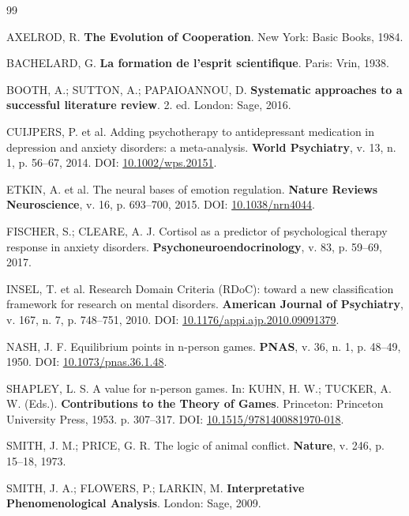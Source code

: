 \documentclass[12pt,a4paper]{article}
\begin{document}
\begin{thebibliography}{99}

AXELROD, R. \textbf{The Evolution of Cooperation}. New York: Basic Books, 1984.

BACHELARD, G. \textbf{La formation de l'esprit scientifique}. Paris: Vrin, 1938.

BOOTH, A.; SUTTON, A.; PAPAIOANNOU, D. \textbf{Systematic approaches to a successful literature review}. 2. ed. London: Sage, 2016.

CUIJPERS, P. et al. Adding psychotherapy to antidepressant medication in depression and anxiety disorders: a meta-analysis. \textbf{World Psychiatry}, v. 13, n. 1, p. 56--67, 2014.
DOI: \href{https://doi.org/10.1002/wps.20151}{10.1002/wps.20151}.

ETKIN, A. et al. The neural bases of emotion regulation. \textbf{Nature Reviews Neuroscience}, v. 16, p. 693--700, 2015.
DOI: \href{https://doi.org/10.1038/nrn4044}{10.1038/nrn4044}.

FISCHER, S.; CLEARE, A. J. Cortisol as a predictor of psychological therapy response in anxiety disorders. \textbf{Psychoneuroendocrinology}, v. 83, p. 59--69, 2017.

INSEL, T. et al. Research Domain Criteria (RDoC): toward a new classification framework for research on mental disorders. \textbf{American Journal of Psychiatry}, v. 167, n. 7, p. 748--751, 2010.
DOI: \href{https://doi.org/10.1176/appi.ajp.2010.09091379}{10.1176/appi.ajp.2010.09091379}.

NASH, J. F. Equilibrium points in n-person games. \textbf{PNAS}, v. 36, n. 1, p. 48--49, 1950.
DOI: \href{https://doi.org/10.1073/pnas.36.1.48}{10.1073/pnas.36.1.48}.

SHAPLEY, L. S. A value for n-person games. In: KUHN, H. W.; TUCKER, A. W. (Eds.). \textbf{Contributions to the Theory of Games}. Princeton: Princeton University Press, 1953. p. 307--317.
DOI: \href{https://doi.org/10.1515/9781400881970-018}{10.1515/9781400881970-018}.

SMITH, J. M.; PRICE, G. R. The logic of animal conflict. \textbf{Nature}, v. 246, p. 15--18, 1973.

SMITH, J. A.; FLOWERS, P.; LARKIN, M. \textbf{Interpretative Phenomenological Analysis}. London: Sage, 2009.


\end{thebibliography}
\end{document}
